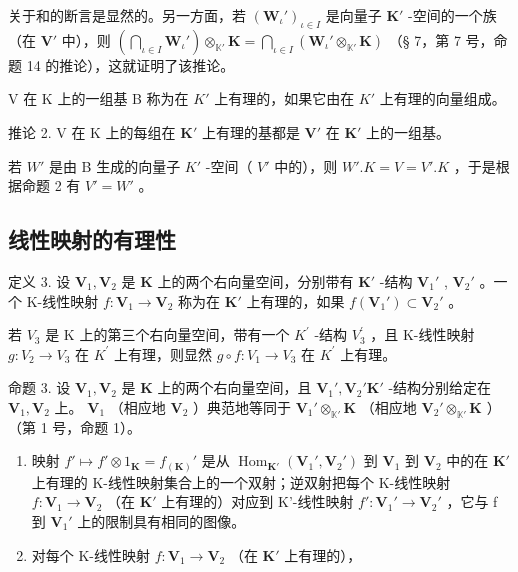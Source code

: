 关于和的断言是显然的。另一方面，若 \((\mathbf{W}_{\iota}')_{\iota \in I}\) 是向量子 \(\mathbf{K}'\) -空间的一个族（在 \(\mathbf{V}'\) 中），则 \(\left(\bigcap_{\iota \in I} \mathbf{W}_{\iota}'\right) \otimes_{\mathbb{K}'} \mathbf{K} = \bigcap_{\iota \in I} (\mathbf{W}_{\iota}' \otimes_{\mathbb{K}'} \mathbf{K})\) （§ 7，第 7 号，命题 14 的推论），这就证明了该推论。

V 在 K 上的一组基 B 称为在 \(K'\) 上有理的，如果它由在 \(K'\) 上有理的向量组成。

推论 2. V 在 K 上的每组在 \(\mathbf{K}'\) 上有理的基都是 \(\mathbf{V}'\) 在 \(\mathbf{K}'\) 上的一组基。

若 \(W'\) 是由 B 生成的向量子 \(K'\) -空间（ \(V'\) 中的），则 \(W'. K = V = V'. K\) ，于是根据命题 2 有 \(V' = W'\) 。

\subsection{线性映射的有理性}

定义 3. 设 \(\mathbf{V}_1, \mathbf{V}_2\) 是 \(\mathbf{K}\) 上的两个右向量空间，分别带有 \(\mathbf{K}'\) -结构 \(\mathbf{V}_1'\) , \(\mathbf{V}_2'\) 。一个 K-线性映射 \(f: \mathbf{V}_1 \to \mathbf{V}_2\) 称为在 \(\mathbf{K}'\) 上有理的，如果 \(f(\mathbf{V}_1') \subset \mathbf{V}_2'\) 。

若 \(V_{3}\) 是 K 上的第三个右向量空间，带有一个 \(K^{\prime}\) -结构 \(V_{3}^{\prime}\) ，且 K-线性映射 \(g:V_{2}\rightarrow V_{3}\) 在 \(K^{\prime}\) 上有理，则显然 \(g\circ f:V_{1}\rightarrow V_{3}\) 在 \(K^{\prime}\) 上有理。

命题 3. 设 \(\mathbf{V}_1, \mathbf{V}_2\) 是 \(\mathbf{K}\) 上的两个右向量空间，且 \(\mathbf{V}_1', \mathbf{V}_2' \mathbf{K}'\) -结构分别给定在 \(\mathbf{V}_1, \mathbf{V}_2\) 上。 \(\mathbf{V}_1\) （相应地 \(\mathbf{V}_2\) ）典范地等同于 \(\mathbf{V}_1' \otimes_{\mathbb{K}'} \mathbf{K}\) （相应地 \(\mathbf{V}_2' \otimes_{\mathbb{K}'} \mathbf{K}\) ）（第 1 号，命题 1）。

\begin{enumerate}
\def\labelenumi{(\roman{enumi})}
\item
  映射 \(f' \mapsto f' \otimes 1_{\mathbf{K}} = f_{(\mathbf{K})}'\) 是从 \(\operatorname{Hom}_{\mathbf{K}'}(\mathbf{V}_1', \mathbf{V}_2')\) 到 \(\mathbf{V}_1\) 到 \(\mathbf{V}_2\) 中的在 \(\mathbf{K}'\) 上有理的 K-线性映射集合上的一个双射；逆双射把每个 K-线性映射 \(f: \mathbf{V}_1 \to \mathbf{V}_2\) （在 \(\mathbf{K}'\) 上有理的）对应到 K'-线性映射 \(f': \mathbf{V}_1' \to \mathbf{V}_2'\) ，它与 f 到 \(\mathbf{V}_1'\) 上的限制具有相同的图像。
\item
  对每个 K-线性映射 \(f: \mathbf{V}_1 \to \mathbf{V}_2\) （在 \(\mathbf{K}'\) 上有理的），
\end{enumerate}

